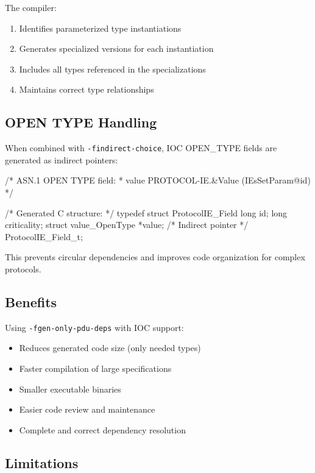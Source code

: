 \documentclass[english,oneside,12pt]{book}
\begin{document}
The compiler:
\begin{enumerate}
\item Identifies parameterized type instantiations
\item Generates specialized versions for each instantiation
\item Includes all types referenced in the specializations
\item Maintains correct type relationships
\end{enumerate}

\subsection*{OPEN TYPE Handling}

When combined with \texttt{-findirect-choice}, IOC OPEN\_TYPE fields are generated 
as indirect pointers:

\begin{example}
/* ASN.1 OPEN TYPE field:
 * value   PROTOCOL-IE.&Value  ({IEsSetParam}{@id})
 */

/* Generated C structure: */
typedef struct ProtocolIE_Field {
    long                     id;
    long                     criticality;
    struct value_OpenType   *value;  /* Indirect pointer */
} ProtocolIE_Field_t;
\end{example}

This prevents circular dependencies and improves code organization for complex protocols.

\subsection*{Benefits}

Using \texttt{-fgen-only-pdu-deps} with IOC support:
\begin{itemize}
\item Reduces generated code size (only needed types)
\item Faster compilation of large specifications
\item Smaller executable binaries
\item Easier code review and maintenance
\item Complete and correct dependency resolution
\end{itemize}

\subsection*{Limitations}
\end{document}
